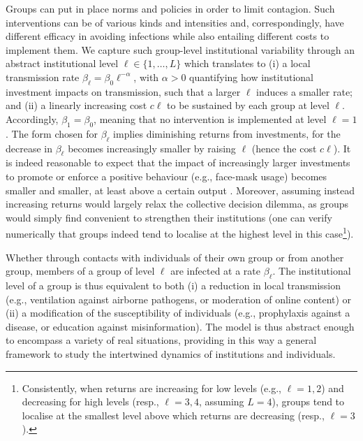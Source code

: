 Groups can put in place norms and policies in order to limit contagion. Such interventions can be of various kinds and intensities and, correspondingly, have different efficacy in avoiding infections while also entailing different costs to implement them. We capture such group-level institutional variability through an abstract institutional level $\ell\in\{1,\dots, L\}$ which translates to (i) a local transmission rate $\beta_\ell = \beta_0\ell^{-\alpha}$, with $\alpha>0$ quantifying how institutional investment impacts on transmission, such that a larger $\ell$ induces a smaller rate; and (ii) a linearly increasing cost $c\ell$ to be sustained by each group at level $\ell$. Accordingly, $\beta_1=\beta_0$, meaning that no intervention is implemented at level $\ell = 1$. The form chosen for $\beta_\ell$ implies diminishing returns from investments, for the decrease in $\beta_\ell$ becomes increasingly smaller by raising $\ell$ (hence the cost $c\ell$). It is indeed reasonable to expect that the impact of increasingly larger investments to promote or enforce a positive behaviour (e.g., face-mask usage) becomes smaller and smaller, at least above a certain output \cite{bishai_costs_2006}. Moreover, assuming instead increasing returns would largely relax the collective decision dilemma, as groups would simply find convenient to strengthen their institutions (one can verify numerically that groups indeed tend to localise at the highest level in this case\footnote{Consistently, when returns are increasing for low levels (e.g., $\ell=1,2$) and decreasing for high levels (resp., $\ell=3,4$, assuming $L = 4$), groups tend to localise at the smallest level above which returns are decreasing (resp., $\ell=3$).}).

Whether through contacts with individuals of their own group or from another group, members of a group of level $\ell$ are infected at a rate $\beta_\ell$. The institutional level of a group is thus equivalent to both (i) a reduction in local transmission (e.g., ventilation against airborne pathogens, or moderation of online content) or (ii) a modification of the susceptibility of individuals (e.g., prophylaxis against a disease, or education against misinformation). The model is thus abstract enough to encompass a variety of real situations, providing in this way a general framework to study the intertwined dynamics of institutions and individuals.

